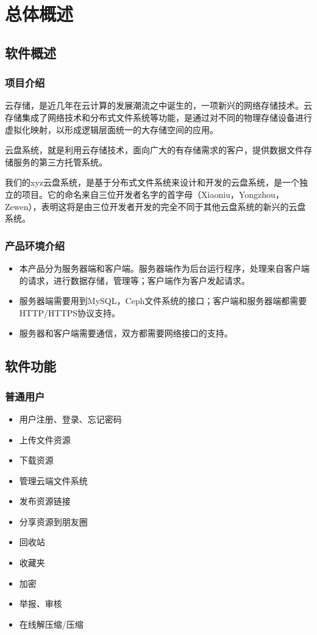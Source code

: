 \chapter{总体概述}

\section{软件概述}
\subsection{项目介绍}
云存储，是近几年在云计算的发展潮流之中诞生的，一项新兴的网络存储技术。云存储集成了网络技术和分布式文件系统等功能，是通过对不同的物理存储设备进行虚拟化映射，以形成逻辑层面统一的大存储空间的应用。

云盘系统，就是利用云存储技术，面向广大的有存储需求的客户，提供数据文件存储服务的第三方托管系统。

我们的xyz云盘系统，是基于分布式文件系统来设计和开发的云盘系统，是一个独立的项目。它的命名来自三位开发者名字的首字母（Xiaoniu，Yongzhou，Zewen），表明这将是由三位开发者开发的完全不同于其他云盘系统的新兴的云盘系统。

\subsection{产品环境介绍}

\begin{itemize}
	\item 本产品分为服务器端和客户端。服务器端作为后台运行程序，处理来自客户端的请求，进行数据存储，管理等；客户端作为客户发起请求。
	\item 服务器端需要用到MySQL，Ceph文件系统的接口；客户端和服务器端都需要HTTP/HTTPS协议支持。
	\item 服务器和客户端需要通信，双方都需要网络接口的支持。
\end{itemize}
\section{软件功能}

\subsection{普通用户}
\begin{itemize}
	\item 用户注册、登录、忘记密码
	\item 上传文件资源
	\item 下载资源
	\item 管理云端文件系统
	\item 发布资源链接
	\item 分享资源到朋友圈
	\item 回收站
	\item 收藏夹
	\item 加密
	\item 举报、审核
	\item 在线解压缩/压缩
\end{itemize}

